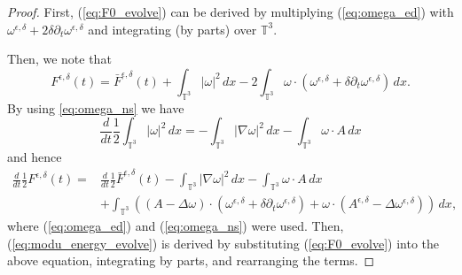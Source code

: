 \documentclass[10pt,a4paper]{amsart}
\begin{document}
\begin{proof}
First, (\ref{eq:F0_evolve}) can be derived by multiplying (\ref{eq:omega_ed}) with $\omega^{\epsilon,\delta} + 2\delta \partial_t \omega^{\epsilon,\delta}$ and integrating (by parts) over $\mathbb T^3$.

Then, we note that
\[
    F^{\epsilon,\delta}(t) = \bar F^{\epsilon,\delta}(t) + \int_{\mathbb T^3} |\omega|^2\,dx - 2\int_{\mathbb T^3} \omega \cdot \left( \omega^{\epsilon,\delta} +\delta\partial_t \omega^{\epsilon,\delta} \right) \,dx.
\]
By using \eqref{eq:omega_ns} we have
\[
    \frac{d}{dt}\frac{1}{2}\int_{\mathbb T^3}|\omega|^2\,dx = -\int_{\mathbb T^3}|\nabla \omega|^2\,dx - \int_{\mathbb T^3}\omega\cdot A\, dx
\]
and hence
\[
\begin{aligned}
    \frac{d}{dt}\frac{1}{2}F^{\epsilon,\delta}(t) =& \frac{d}{dt}\frac{1}{2}\bar F^{\epsilon,\delta}(t) - \int_{\mathbb T^3}|\nabla \omega|^2\,dx - \int_{\mathbb T^3}\omega\cdot A\, dx \\
    &+ \int_{\mathbb T^3} \left( (A-\Delta\omega) \cdot \left(\omega^{\epsilon,\delta} + \delta \partial_t \omega^{\epsilon,\delta}\right) + \omega \cdot (A^{\epsilon,\delta}-\Delta \omega^{\epsilon,\delta}) \right) \,dx,
\end{aligned}
\]
where (\ref{eq:omega_ed}) and (\ref{eq:omega_ns}) were used. Then, (\ref{eq:modu_energy_evolve}) is derived by substituting (\ref{eq:F0_evolve}) into the above equation, integrating by parts, and rearranging the terms.
\end{proof}
\end{document}

